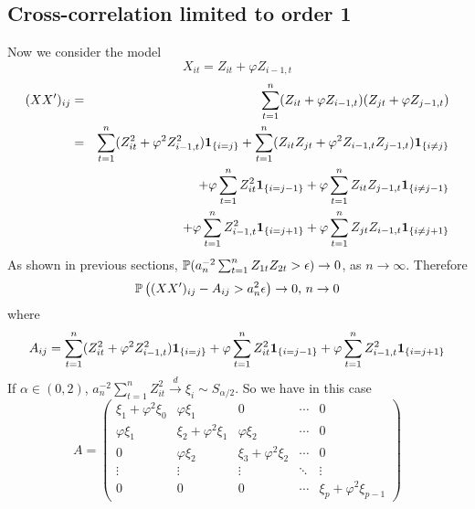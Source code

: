 \documentclass{article}
\begin{document}
\subsection{Cross-correlation limited to order 1}\label{sec:B1}
Now we consider the model
\[
X_{it} = Z_{it} + \varphi Z_{i-1,t}
\]
\begin{eqnarray*}
  (XX')_{ij} &=& \sum_{t=1}^n (Z_{it} + \varphi Z_{i-1,t})(Z_{jt} +
  \varphi Z_{j-1,t}) \\
  &=& \sum_{t=1}^n (Z_{it}^2 + \varphi^2 Z_{i-1,t}^2)\I{i=j}
  + \sum_{t=1}^n (Z_{it}Z_{jt}+\varphi^2 Z_{i-1,t}Z_{j-1,t})\I{i\neq j}
  \\
  && + \varphi \sum_{t=1}^n Z_{it}^2 \I{i=j-1} 
  +\varphi\sum_{t=1}^n Z_{it} Z_{j-1,t}\I{i\neq j-1} \\
  && + \varphi \sum_{t=1}^n Z_{i-1,t}^2 \I{i=j+1} 
  +\varphi\sum_{t=1}^n Z_{jt} Z_{i-1,t}\I{i\neq j+1} \\
\end{eqnarray*}
As shown in previous sections, $\P(a_n^{-2} \sum_{t=1}^n Z_{1t}Z_{2t} >
\epsilon) \to 0$, as $n \to \infty$. Therefore
\[
\P\left(
  (XX')_{ij} - A_{ij}> a_n^2 \epsilon \right) \to 0\text{,  }n \to 0
\]
where
\[
A_{ij} = \sum_{t=1}^n (Z_{it}^2 + \varphi^2 Z_{i-1,t}^2)\I{i=j}
      + \varphi \sum_{t=1}^n Z_{it}^2 \I{i=j-1} 
      + \varphi \sum_{t=1}^n Z_{i-1,t}^2 \I{i=j+1}
\]
If $\alpha \in (0,2)$, $a_n^{-2}\sum_{t=1}^n Z_{it}^2 \xrightarrow{d}
\xi_i \sim S_{\alpha/2}$. So we have in this case
\[
A =
\begin{pmatrix}
  \xi_1 + \varphi^2 \xi_0 & \varphi \xi_1 & 0 & \cdots & 0 \\
  \varphi \xi_1 & \xi_2 + \varphi^2 \xi_1 & \varphi \xi_2 & \cdots & 0 \\
  0 & \varphi \xi_2 & \xi_3 + \varphi^2 \xi_2 & \cdots & 0 \\
  \vdots & \vdots & \vdots & \ddots & \vdots \\
  0 & 0 & 0 & \cdots & \xi_p + \varphi^2 \xi_{p-1}
\end{pmatrix}
\]
\end{document}
